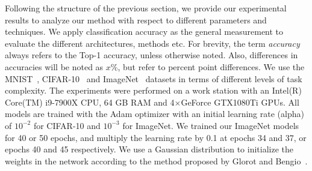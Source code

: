 \documentclass[10pt,twocolumn,letterpaper]{article}
\begin{document}
Following the structure of the previous section, we provide our experimental results to analyze our method with respect to different parameters and techniques.
We apply classification accuracy as the general measurement to evaluate the different architectures, methods etc.
For brevity, the term \emph{accuracy} always refers to the Top-1 accuracy, unless otherwise noted.
Also, differences in accuracies will be noted as $x$\%, but refer to percent point differences.
We use the MNIST~\cite{lecun-mnisthandwrittendigit-2010}, CIFAR-10~\cite{cifar10} and ImageNet~\cite{imagenet_cvpr09} datasets in terms of different levels of task complexity.
The experiments were performed on a work station with an Intel(R) Core(TM) i9-7900X CPU, 64 GB RAM and 4$\times$GeForce GTX1080Ti GPUs.
All models are trained with the Adam optimizer \cite{kingma2014adam} with an initial learning rate (alpha) of $10^{-2}$ for CIFAR-10 and $10^{-3}$ for ImageNet.
We trained our ImageNet models for 40 or 50 epochs, and multiply the learning rate by 0.1 at epochs 34 and 37, or epochs 40 and 45 respectively.
We use a Gaussian distribution to initialize the weights in the network according to the method proposed by Glorot and Bengio~\cite{glorot2010understanding}.
\end{document}
